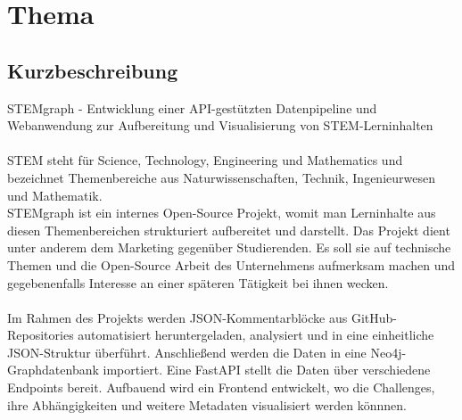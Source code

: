 \section{Thema}

\subsection{Kurzbeschreibung}

STEMgraph - Entwicklung einer API-gestützten Datenpipeline und Webanwendung zur Aufbereitung und Visualisierung von STEM-Lerninhalten
\\\\
STEM steht für Science, Technology, Engineering und Mathematics und bezeichnet Themenbereiche aus Naturwissenschaften, Technik, Ingenieurwesen und Mathematik.
\\
STEMgraph ist ein internes Open-Source Projekt, womit man Lerninhalte aus diesen Themenbereichen strukturiert aufbereitet und darstellt.
Das Projekt dient unter anderem dem Marketing gegenüber Studierenden. Es soll sie auf technische Themen und die Open-Source Arbeit des Unternehmens aufmerksam machen und gegebenenfalls Interesse an einer späteren Tätigkeit bei ihnen wecken.
\\\\
Im Rahmen des Projekts werden JSON-Kommentarblöcke aus GitHub-Repositories automatisiert heruntergeladen, analysiert und in eine einheitliche JSON-Struktur überführt.
Anschließend werden die Daten in eine Neo4j-Graphdatenbank importiert.
Eine FastAPI stellt die Daten über verschiedene Endpoints bereit.
Aufbauend wird ein Frontend entwickelt, wo die Challenges, ihre Abhängigkeiten und weitere Metadaten visualisiert werden könnnen. 